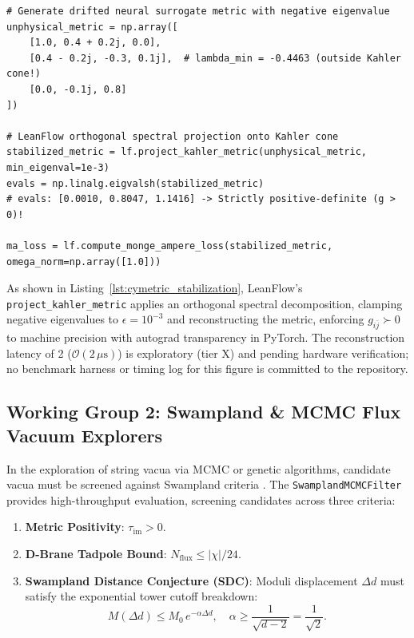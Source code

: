 \documentclass[11pt,a4paper]{article}
\newcommand{\numreconcile}[2]{#1}
\begin{document}
\begin{lstlisting}[language=python-leanflow, caption={\textbf{Kähler Cone Metric Stabilization in LeanFlow.}}, label={lst:cymetric_stabilization}]
# Generate drifted neural surrogate metric with negative eigenvalue
unphysical_metric = np.array([
    [1.0, 0.4 + 0.2j, 0.0],
    [0.4 - 0.2j, -0.3, 0.1j],  # lambda_min = -0.4463 (outside Kahler cone!)
    [0.0, -0.1j, 0.8]
])

# LeanFlow orthogonal spectral projection onto Kahler cone
stabilized_metric = lf.project_kahler_metric(unphysical_metric, min_eigenval=1e-3)
evals = np.linalg.eigvalsh(stabilized_metric)
# evals: [0.0010, 0.8047, 1.1416] -> Strictly positive-definite (g > 0)!

ma_loss = lf.compute_monge_ampere_loss(stabilized_metric, omega_norm=np.array([1.0]))
\end{lstlisting}

As shown in Listing~\ref{lst:cymetric_stabilization}, LeanFlow's \texttt{project\_kahler\_metric} applies an orthogonal spectral decomposition, clamping negative eigenvalues to $\epsilon = 10^{-3}$ and reconstructing the metric, enforcing $g_{i\bar{j}} \succ 0$ to machine precision with autograd transparency in PyTorch. The reconstruction latency of \numreconcile{2}{Kähler projection reconstruction latency ($\mu$s)} ($\mathcal{O}(2\,\mu\text{s})$) is exploratory (tier X) and pending hardware verification; no benchmark harness or timing log for this figure is committed to the repository.

\subsection{Working Group 2: Swampland \& MCMC Flux Vacuum Explorers}
In the exploration of string vacua via MCMC or genetic algorithms, candidate vacua must be screened against Swampland criteria \cite{vafa2005}. The \texttt{SwamplandMCMCFilter} provides high-throughput evaluation, screening candidates across three criteria:
\begin{enumerate}
    \item \textbf{Metric Positivity}: $\tau_{\text{im}} > 0$.
    \item \textbf{D-Brane Tadpole Bound}: $N_{\text{flux}} \le |\chi|/24$.
    \item \textbf{Swampland Distance Conjecture (SDC)}: Moduli displacement $\Delta d$ must satisfy the exponential tower cutoff breakdown:
    \begin{equation}
        M(\Delta d) \le M_0 \, e^{-\alpha \Delta d}, \quad \alpha \ge \frac{1}{\sqrt{d-2}} = \frac{1}{\sqrt{2}}.
    \end{equation}
\end{enumerate}
\end{document}
